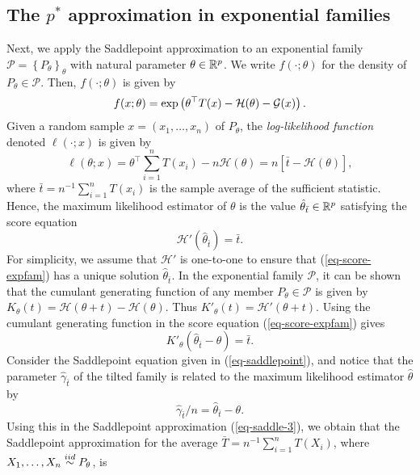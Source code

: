 \subsection{The $p^*$ approximation in exponential families} \label{sec-pstar}

Next, we apply the Saddlepoint approximation to an exponential family $\mathcal{P} = \left\{P_\theta\right\}_{\theta}$ with natural parameter $\theta \in {\mathbb{R}^p}$. We write $f(\cdot; \theta)$ for the density of $P_\theta \in \mathcal{P}$. Then, $f(\cdot; \theta)$ is given by
\begin{equation*}
    f(x; \theta) = \exp\left(\theta^\top T(x) - \mathcal{H}(\theta) - \mathcal{G}(x)\right).
\end{equation*}
Given a random sample $x = (x_1, \ldots, x_n)$ of $P_\theta$, the \textit{log-likelihood function} denoted $\ell(\cdot; x)$ is given by
\begin{equation*}
    \ell(\theta; x) = \theta^\top \sum_{i=1}^n T(x_i) - n \mathcal{H}(\theta) = n\left[\bar t - \mathcal{H}(\theta)\right],
\end{equation*}
where $\bar t = n^{-1}\sum_{i=1}^n T(x_i)$ is the sample average of the sufficient statistic. Hence, the maximum likelihood estimator of $\theta$ is the value $\hat\theta_{\bar t} \in {\mathbb{R}^p}$ satisfying the score equation
\begin{equation} \label{eq-score-expfam}
    \mathcal{H}'(\hat\theta_{\bar t}) = \bar t.
\end{equation}
For simplicity, we assume that $\mathcal{H}'$ is one-to-one to ensure that (\ref{eq-score-expfam}) has a unique solution $\hat\theta_{\bar t}$. In the exponential family $\mathcal{P}$, it can be shown that the cumulant generating function of any member $P_\theta \in \mathcal{P}$ is given by $K_\theta(t) = \mathcal{H}(\theta + t) - \mathcal{H}(\theta)$. Thus $K'_\theta(t) = \mathcal{H}'(\theta + t)$. Using the cumulant generating function in the score equation (\ref{eq-score-expfam}) gives
\begin{equation*}
    K'_\theta(\hat\theta_{\bar t} - \theta) = \bar t.
\end{equation*}
Consider the Saddlepoint equation given in (\ref{eq-saddlepoint}), and notice that the parameter $\hat\gamma_{\bar t}$ of the tilted family is related to the maximum likelihood estimator $\hat\theta$ by
\begin{equation*}
    \hat\gamma_{\bar t}/n = \hat\theta_{\bar t} - \theta.
\end{equation*}
Using this in the Saddlepoint approximation (\ref{eq-saddle-3}), we obtain that the Saddlepoint approximation for the average $\bar T = n^{-1}\sum_{i=1}^n T(X_i)$, where $X_1, \ldots, X_n \stackrel{iid}{\sim} P_\theta$, is

